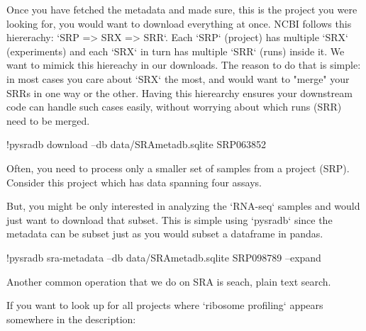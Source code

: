 \documentclass[9pt,a4paper]{extarticle}
\newenvironment{allintypewriter}{\ttfamily}{\par}
\begin{document}
Once you have fetched the metadata and made sure, this is the project
you were looking for, you would want to download everything at once.
NCBI follows this hiererachy: `SRP => SRX => SRR`. Each `SRP` (project) has multiple
`SRX` (experiments) and each `SRX` in turn has multiple `SRR` (runs) inside it.
We want to mimick this hiereachy in our downloads. The reason to do that is simple:
in most cases you care about `SRX` the most, and would want to "merge" your SRRs
in one way or the other. Having this hierearchy ensures your downstream code
can handle such cases easily, without worrying about which runs (SRR) need to be merged.


\begin{allintypewriter}
!pysradb download --db data/SRAmetadb.sqlite SRP063852 
\end{allintypewriter}

Often, you need to process only a smaller set of samples from a project (SRP).
Consider this project which has data spanning four assays.



But, you might be only interested in analyzing the `RNA-seq` samples and would just want to download that subset.
This is simple using `pysradb` since the metadata can be subset just as you would subset a dataframe in
pandas.




\begin{allintypewriter}
!pysradb sra-metadata --db data/SRAmetadb.sqlite  SRP098789 --expand
\end{allintypewriter}



Another common operation that we do on SRA is seach, plain text search.


If you want to look up for all projects where `ribosome profiling` appears somewhere
in the description:
\end{document}
